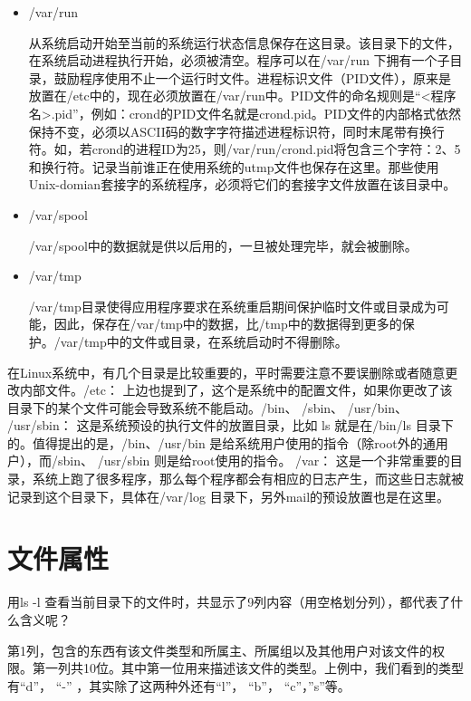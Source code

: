 \begin{itemize}
\begin{itemize}
		\item /var/run
		
		\qquad 从系统启动开始至当前的系统运行状态信息保存在这目录。该目录下的文件，在系统启动进程执行开始，必须被清空。程序可以在/var/run 下拥有一个子目录，鼓励程序使用不止一个运行时文件。进程标识文件（PID文件），原来是放置在/etc中的，现在必须放置在/var/run中。PID文件的命名规则是“<程序名>.pid”，例如：crond的PID文件名就是crond.pid。PID文件的内部格式依然保持不变，必须以ASCII码的数字字符描述进程标识符，同时末尾带有换行符。如，若crond的进程ID为25，则/var/run/crond.pid将包含三个字符：2、5和换行符。记录当前谁正在使用系统的utmp文件也保存在这里。那些使用Unix-domian套接字的系统程序，必须将它们的套接字文件放置在该目录中。
		
		\item /var/spool
		
		\qquad /var/spool中的数据就是供以后用的，一旦被处理完毕，就会被删除。
		
		\item /var/tmp
		
		\qquad /var/tmp目录使得应用程序要求在系统重启期间保护临时文件或目录成为可能，因此，保存在/var/tmp中的数据，比/tmp中的数据得到更多的保护。/var/tmp中的文件或目录，在系统启动时不得删除。
	\end{itemize}
\end{itemize}

在Linux系统中，有几个目录是比较重要的，平时需要注意不要误删除或者随意更改内部文件。/etc： 上边也提到了，这个是系统中的配置文件，如果你更改了该目录下的某个文件可能会导致系统不能启动。/bin、 /sbin、 /usr/bin、 /usr/sbin： 这是系统预设的执行文件的放置目录，比如 ls 就是在/bin/ls 目录下的。值得提出的是，/bin、/usr/bin 是给系统用户使用的指令（除root外的通用户），而/sbin、 /usr/sbin 则是给root使用的指令。 /var： 这是一个非常重要的目录，系统上跑了很多程序，那么每个程序都会有相应的日志产生，而这些日志就被记录到这个目录下，具体在/var/log 目录下，另外mail的预设放置也是在这里。



\section{文件属性}
用ls -l 查看当前目录下的文件时，共显示了9列内容（用空格划分列），都代表了什么含义呢？

第1列，包含的东西有该文件类型和所属主、所属组以及其他用户对该文件的权限。第一列共10位。其中第一位用来描述该文件的类型。上例中，我们看到的类型有“d”， “-” ，其实除了这两种外还有“l”， “b”， “c”，”s”等。

